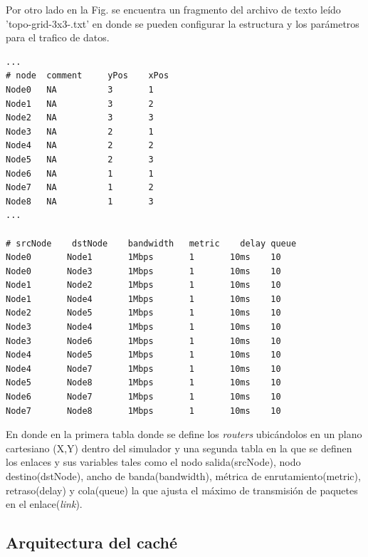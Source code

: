 \documentclass[12pt]{ociamthesis}  %
\begin{document}
\pagebreak
Por otro lado en la Fig. se encuentra un fragmento del archivo de texto leído 'topo-grid-3x3-.txt' en donde se pueden configurar la estructura y los parámetros para el trafico de datos.

\begin{lstlisting}[frame=single]
...
# node  comment     yPos    xPos
Node0   NA          3       1
Node1   NA          3       2
Node2   NA          3       3
Node3   NA          2       1
Node4   NA          2       2
Node5   NA          2       3
Node6   NA          1       1
Node7   NA          1       2
Node8   NA          1       3
...

# srcNode    dstNode    bandwidth   metric    delay queue
Node0       Node1       1Mbps       1       10ms    10
Node0       Node3       1Mbps       1       10ms    10
Node1       Node2       1Mbps       1       10ms    10
Node1       Node4       1Mbps       1       10ms    10
Node2       Node5       1Mbps       1       10ms    10
Node3       Node4       1Mbps       1       10ms    10
Node3       Node6       1Mbps       1       10ms    10
Node4       Node5       1Mbps       1       10ms    10
Node4       Node7       1Mbps       1       10ms    10
Node5       Node8       1Mbps       1       10ms    10
Node6       Node7       1Mbps       1       10ms    10
Node7       Node8       1Mbps       1       10ms    10
\end{lstlisting}

En donde en la primera tabla donde se define los \textit{routers} ubicándolos en un plano cartesiano (X,Y) dentro del simulador y una segunda tabla en la que se definen los enlaces y sus variables tales como el nodo salida(srcNode), nodo destino(dstNode), ancho de banda(bandwidth), métrica de enrutamiento(metric), retraso(delay) y cola(queue) la que ajusta el máximo de transmisión de paquetes en el enlace(\textit{link}).

\pagebreak

\subsection{Arquitectura del caché}
\end{document}
